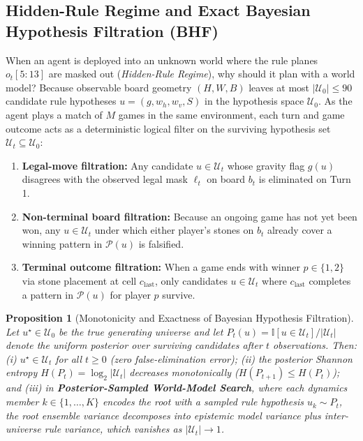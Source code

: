 \documentclass[preprint,3p,times]{elsarticle}
\newtheorem{proposition}{Proposition}
\begin{document}
\subsection{Hidden-Rule Regime and Exact Bayesian Hypothesis Filtration (BHF)}
\label{sec:cronenberg}
When an agent is deployed into an unknown world where the rule planes $o_t[5{:}13]$ are masked out (\emph{Hidden-Rule Regime}), why should it plan with a world model? Because observable board geometry $(H, W, B)$ leaves at most $|\mathcal{U}_0| \le 90$ candidate rule hypotheses $u = (g, w_h, w_v, S)$ in the hypothesis space $\mathcal{U}_0$. As the agent plays a match of $M$ games in the same environment, each turn and game outcome acts as a deterministic logical filter on the surviving hypothesis set $\mathcal{U}_t \subseteq \mathcal{U}_0$:
\begin{enumerate}
    \item \textbf{Legal-move filtration:} Any candidate $u \in \mathcal{U}_t$ whose gravity flag $g(u)$ disagrees with the observed legal mask $\ell_t$ on board $b_t$ is eliminated on Turn 1.
    \item \textbf{Non-terminal board filtration:} Because an ongoing game has not yet been won, any $u \in \mathcal{U}_t$ under which either player's stones on $b_t$ already cover a winning pattern in $\mathcal{P}(u)$ is falsified.
    \item \textbf{Terminal outcome filtration:} When a game ends with winner $p \in \{1, 2\}$ via stone placement at cell $c_{\text{last}}$, only candidates $u \in \mathcal{U}_t$ where $c_{\text{last}}$ completes a pattern in $\mathcal{P}(u)$ for player $p$ survive.
\end{enumerate}

\begin{proposition}[Monotonicity and Exactness of Bayesian Hypothesis Filtration]
\label{prop:cfc}
Let $u^\star \in \mathcal{U}_0$ be the true generating universe and let $P_t(u) = \mathbb{I}[u \in \mathcal{U}_t] / |\mathcal{U}_t|$ denote the uniform posterior over surviving candidates after $t$ observations. Then: (i) $u^\star \in \mathcal{U}_t$ for all $t \ge 0$ (zero false-elimination error); (ii) the posterior Shannon entropy $H(P_t) = \log_2 |\mathcal{U}_t|$ decreases monotonically ($H(P_{t+1}) \le H(P_t)$); and (iii) in \textbf{Posterior-Sampled World-Model Search}, where each dynamics member $k \in \{1,\dots,K\}$ encodes the root with a sampled rule hypothesis $u_k \sim P_t$, the root ensemble variance decomposes into epistemic model variance plus inter-universe rule variance, which vanishes as $|\mathcal{U}_t| \to 1$.
\end{proposition}
\end{document}
